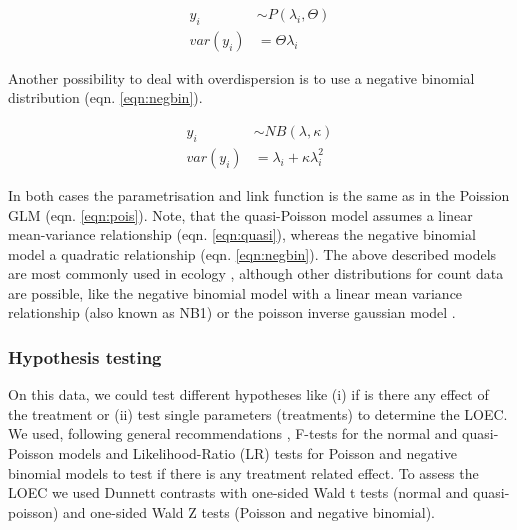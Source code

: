 \documentclass{scrartcl}
\begin{document}
\begin{align}
  y_i &\sim P(\lambda_i, \Theta) \label{eqn:quasi} \\
  var(y_i) &= \Theta \lambda_i  \nonumber
\end{align}

Another possibility to deal with overdispersion is to use a negative binomial distribution (eqn. \ref{eqn:negbin}).

\begin{align}
  y_i &\sim NB(\lambda, \kappa) \label{eqn:negbin}  \\
  var(y_i) &= \lambda_i + \kappa \lambda_i^2 \nonumber
\end{align}

In both cases the parametrisation and link function is the same as in the Poission GLM (eqn. \ref{eqn:pois}).
Note, that the quasi-Poisson model assumes a linear mean-variance relationship (eqn. \ref{eqn:quasi}), whereas the negative binomial model a quadratic relationship (eqn. \ref{eqn:negbin}).
The above described models are most commonly used in ecology \citep{ver_hoef_quasi-poisson_2007}, although other distributions for count data are possible, like the negative binomial model with a linear mean variance relationship (also known as NB1) or the poisson inverse gaussian model \citep{hilbe_modeling_2014}.


\subsubsection{Hypothesis testing}
On this data, we could test different hypotheses like (i) if is there any effect of the treatment or (ii) test single parameters (treatments) to determine the LOEC.
We used, following general recommendations \citep{bolker_generalized_2009}, F-tests for the normal and quasi-Poisson models and Likelihood-Ratio (LR) tests for Poisson and negative binomial models to test if there is any treatment related effect.
To assess the LOEC we used Dunnett contrasts with one-sided Wald t tests (normal and quasi-poisson) and one-sided Wald Z tests (Poisson and negative binomial).
\end{document}
